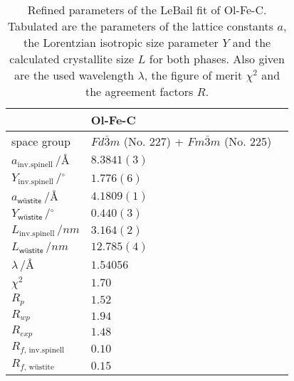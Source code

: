 \documentclass[\main/dresen_thesis.tex]{subfiles}
\begin{document}
  \begin{table}[ht]
    \centering
    \caption{\label{tab:colloidalCrystals:nanoparticle:discussion:xrdLeBail}Refined parameters of the LeBail fit of Ol-Fe-C. Tabulated are the parameters of the lattice constants $a$, the Lorentzian isotropic size parameter $Y$ and the calculated crystallite size $L$ for both phases. Also given are the used wavelength $\lambda$, the figure of merit $\chi^2$ and the agreement factors $R$.}
    \begin{tabular}{ l | l | l }
      \hline
      \rule{0pt}{2ex} & \textbf{Ol-Fe-C}\\
      \hline
      \hline
      \rule{0pt}{2ex}space group & $Fd\bar{3}m$ (No. 227) + $Fm\bar{3}m$ (No. 225)\\
      \hline
      \rule{0pt}{2ex} $a_\mathrm{inv. spinell} \,/ \unit{\angstrom}$         &  $8.3841(3)$  \\
      \rule{0pt}{2ex} $Y_\mathrm{inv. spinell} \,/ \unit{^\circ}$            &  $1.776 (6)$   \\
      \rule{0pt}{2ex} $a_\textsf{w\"ustite}     \,/ \unit{\angstrom}$        &  $4.1809(1)$  \\
      \rule{0pt}{2ex} $Y_\textsf{w\"ustite}     \,/ \unit{^\circ}$           &  $0.440(3)$   \\
      \hline
      \rule{0pt}{2ex} $L_\mathrm{inv. spinell} \,/ \unit{nm}$                &  $3.164(2)$ \\
      \rule{0pt}{2ex} $L_\textsf{w\"ustite}      \,/ \unit{nm}$              &  $12.785(4)$ \\
      \hline
      \rule{0pt}{2ex} $\lambda \,/ \unit{\angstrom}$                         &  $1.54056$\\
      \hline
      \rule{0pt}{2ex} $\chi^2$                                               &  $1.70$ \\
      \rule{0pt}{2ex} $R_p$                                                  &  $1.52$ \\
      \rule{0pt}{2ex} $R_{wp}$                                               &  $1.94$ \\
      \rule{0pt}{2ex} $R_{exp}$                                              &  $1.48$ \\
      \rule{0pt}{2ex} $R_{f, \, \mathrm{inv. spinell}}$                      &  $0.10$ \\
      \rule{0pt}{2ex} $R_{f, \, \text{w\"ustite}}$                           &  $0.15$ \\
      \hline
    \end{tabular}
  \end{table}
\end{document}
